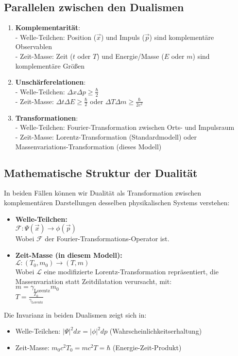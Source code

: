 \documentclass[a4paper,12pt]{article}
\newcommand{\Tzero}{T_0}
\newcommand{\vecx}{\vec{x}}
\newcommand{\gammaf}{\gamma_{\text{Lorentz}}}
\begin{document}
	\subsection{Parallelen zwischen den Dualismen}
	\begin{enumerate}
		\item \textbf{Komplementarität}: \\
		- Welle-Teilchen: Position ($\vecx$) und Impuls ($\vec{p}$) sind komplementäre Observablen \\
		- Zeit-Masse: Zeit ($t$ oder $T$) und Energie/Masse ($E$ oder $m$) sind komplementäre Größen
		\item \textbf{Unschärferelationen}: \\
		- Welle-Teilchen: $\Delta x \Delta p \geq \frac{\hbar}{2}$ \\
		- Zeit-Masse: $\Delta t \Delta E \geq \frac{\hbar}{2}$ oder $\Delta T \Delta m \geq \frac{\hbar}{2c^2}$
		\item \textbf{Transformationen}: \\
		- Welle-Teilchen: Fourier-Transformation zwischen Orts- und Impulsraum \\
		- Zeit-Masse: Lorentz-Transformation (Standardmodell) oder \\Massenvariations-Transformation (dieses Modell)
	\end{enumerate}
	
	\subsection{Mathematische Struktur der Dualität}
	In beiden Fällen können wir Dualität als Transformation zwischen komplementären Darstellungen desselben physikalischen Systems verstehen:
	\begin{itemize}
		\item \textbf{Welle-Teilchen:} \\
		$\mathcal{F}: \Psi(\vecx) \rightarrow \phi(\vec{p})$ \\
		Wobei $\mathcal{F}$ der Fourier-Transformations-Operator ist.
		\item \textbf{Zeit-Masse (in diesem Modell):} \\
		$\mathcal{L}: (\Tzero, m_0) \rightarrow (T, m)$ \\
		Wobei $\mathcal{L}$ eine modifizierte Lorentz-Transformation repräsentiert, die Massenvariation statt Zeitdilatation verursacht, mit: \\
		$m = \gammaf m_0$ \\
		$T = \frac{\Tzero}{\gammaf}$
	\end{itemize}
	Die Invarianz in beiden Dualismen zeigt sich in:
	\begin{itemize}
		\item Welle-Teilchen: $|\Psi|^2 dx = |\phi|^2 dp$ (Wahrscheinlichkeitserhaltung)
		\item Zeit-Masse: $m_0c^2\Tzero = mc^2T = \hbar$ (Energie-Zeit-Produkt)
	\end{itemize}
	
\end{document}
